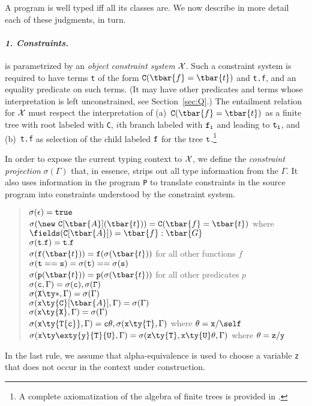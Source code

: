 A program is well typed iff all its classes are. We now describe in more detail each of these judgments, in turn. 


\paragraph{\normalfont\bf\em 1. Constraints.}
{}\FXG{} is parametrized by an {\em object constraint system} $\cal
X$.  Such a constraint system is required to have terms {\tt t} of the
form ${\tt C}(\tbar{f}=\tbar{t})$ and {\tt t.f}, and an equality
predicate on such terms. (It may have other predicates and terms whose interpretation is left unconstrained, see Section~\ref{sec:Q}.)
The entailment relation for $\cal X$ must respect the interpretation of
(a)~${\tt C}(\tbar{f}=\tbar{t})$ as a finite tree with root
labeled with {\tt C}, $i$th branch labeled with $\tt f_i$ and leading to
$\tt t_i$, and (b)~{\tt t.f} as selection of the child labeled
$\tt f$ for the tree $\tt t$.\footnote{A complete axiomatization of the algebra of finite trees is provided in \cite{maher-tree}.}

In order to expose the current typing context to $\cal X$, we define
the {\em constraint projection} $\sigma(\Gamma)$ that, in essence,
strips out all type information from the $\Gamma$. It also uses
information in the program {\tt P} to translate constraints in the source
program into constraints understood by the constraint system.
 
\begin{quote}
\noindent $\sigma(\epsilon)={\tt true}$\\
$\sigma(\new~{\tt C}[\tbar{A}](\tbar{t}))={\tt C}(\tbar{f}=\tbar{t})$ 
 where $\fields({\tt C}[\tbar{A}])=\tbar{f}:\tbar{G}$\\
$\sigma({\tt t.f}) = {\tt t.f}$\\
$\sigma({\tt f}(\tbar{t}))={\tt f}(\sigma(\tbar{t}))$  for all other functions $f$\\
$\sigma({\tt t==s})=\sigma({\tt t})==\sigma(\tt {s})$\\
$\sigma({\tt p}(\tbar{t}))={\tt p}(\sigma(\tbar{t}))$  for all other predicates $p$\\
$\sigma({\tt c},\Gamma) = \sigma(\tt c), \sigma(\Gamma)$\\
$\sigma({\tt X}\ty*, \Gamma)=\sigma(\Gamma)$\\
$\sigma({\tt x}\ty{\tt C}[\tbar{A}], \Gamma)=\sigma(\Gamma)$\\
$\sigma({\tt x}\ty{\tt X}, \Gamma)=\sigma(\Gamma)$\\
$\sigma({\tt x}\ty{\tt T\{c\}}, \Gamma)={\tt c}\theta,\sigma({\tt x}\ty{\tt T},\Gamma)$  where $\theta={\tt x}/\self$\\
$\sigma({\tt x}\ty\exty{{\tt y}}{{\tt T}}{{\tt U}}, \Gamma)=\sigma({\tt z}\ty{\tt T}, {\tt x}\ty{\tt U}\theta,\Gamma)$  where $\theta={\tt z}/{\tt y}$
\end{quote}
%
In the last rule, we assume that alpha-equivalence is used to choose a variable {\tt z} that does not occur in the context under construction.

